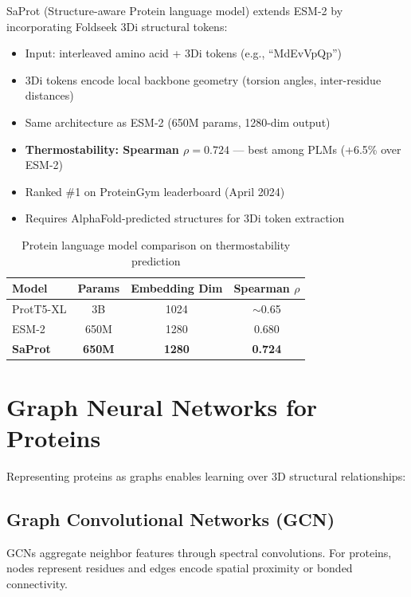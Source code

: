 SaProt (Structure-aware Protein language model) \cite{su2024saprot} extends ESM-2 by incorporating Foldseek 3Di structural tokens:
\begin{itemize}
    \item Input: interleaved amino acid + 3Di tokens (e.g., ``MdEvVpQp'')
    \item 3Di tokens encode local backbone geometry (torsion angles, inter-residue distances)
    \item Same architecture as ESM-2 (650M params, 1280-dim output)
    \item \textbf{Thermostability: Spearman $\rho = 0.724$} --- best among PLMs (+6.5\% over ESM-2)
    \item Ranked \#1 on ProteinGym leaderboard (April 2024)
    \item Requires AlphaFold-predicted structures for 3Di token extraction
\end{itemize}

\begin{table}[h]
\centering
\caption{Protein language model comparison on thermostability prediction}
\label{tab:plm_comparison}
\begin{tabular}{lccc}
\toprule
\textbf{Model} & \textbf{Params} & \textbf{Embedding Dim} & \textbf{Spearman $\rho$} \\
\midrule
ProtT5-XL & 3B & 1024 & $\sim$0.65 \\
ESM-2 & 650M & 1280 & 0.680 \\
\textbf{SaProt} & \textbf{650M} & \textbf{1280} & \textbf{0.724} \\
\bottomrule
\end{tabular}
\end{table}

\section{Graph Neural Networks for Proteins}

Representing proteins as graphs enables learning over 3D structural relationships:

\subsection{Graph Convolutional Networks (GCN)}

GCNs \cite{kipf2017semi} aggregate neighbor features through spectral convolutions. For proteins, nodes represent residues and edges encode spatial proximity or bonded connectivity.

